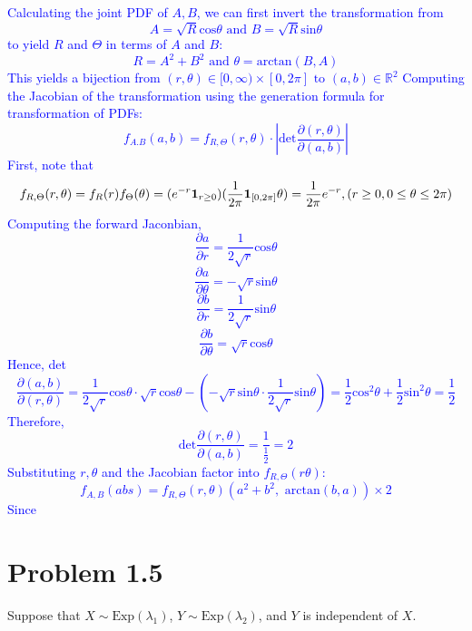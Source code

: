 \documentclass{article}
\begin{document}
\begin{enumerate}[label=(\alph*)]
        \textcolor{blue}{Calculating the joint PDF of $A,B$, we can first invert the transformation from $$A=\sqrt{R}\text{cos}\theta \text{ and } B= \sqrt{R}\text{sin}\theta$$
        to yield $R$ and $\Theta$ in terms of $A$ and $B$:
    $$R=A^2+B^2 \text{ and } \theta=\text{arctan}(B,A)$$
    This yields a bijection from $(r,\theta)\in [0,\infty) \times [0,2\pi] \text{ to } (a,b)\in \mathbb{R}^2$
Computing the Jacobian of the transformation using the generation formula for transformation of PDFs:
$$f_{A.B}(a,b)=f_{R,\Theta}(r,\theta)\cdot \left| \text{det}\frac{\partial(r,\theta)}{\partial(a,b)}\right|$$
First, note that $$f_{R,\Theta}(r,\theta)=f_R(r)f_{\Theta}(\theta)=(e^{-r}\mathbf{1}_{r\geq 0})(\frac{1}{2\pi}\mathbf{1}_{[0,2\pi]}\theta)=\frac{1}{2\pi}e^{-r}, \\ (r\geq 0, 0 \leq \theta \leq 2\pi)$$
Computing the forward Jaconbian, $$\frac{\partial a}{\partial r}=\frac{1}{2\sqrt{r}}\text{cos}\theta$$
$$\frac{\partial a}{\partial \theta}=-\sqrt{r}\text{sin}\theta$$
$$\frac{\partial b}{\partial r}=\frac{1}{2\sqrt{r}}\text{sin}\theta$$
$$\frac{\partial b}{\partial \theta}=\sqrt{r}\text{cos}\theta$$
Hence, det$$\frac{\partial (a,b)}{\partial (r,\theta)}=\frac{1}{2\sqrt{r}}\text{cos}\theta \cdot \sqrt{r}\text{cos}\theta - (-\sqrt{r}\text{sin}\theta \cdot \frac{1}{2\sqrt{r}}\text{sin}\theta)=\frac{1}{2}\text{cos}^2\theta + \frac{1}{2}\text{sin}^2\theta=\frac{1}{2}$$
Therefore, $$\text{det}\frac{\partial (r, \theta)}{\partial (a, b)}=\frac{1}{\frac{1}{2}}=2$$
Substituting $r, \theta$ and the Jacobian factor into $f_{R,\Theta}(r\theta)$:
$$f_{A,B}(abs)=f_{R,\Theta}(r,\theta)(a^2+b^2, \text{ arctan}(b,a)) \times 2$$
Since }

\end{enumerate}

\section*{Problem 1.5}
Suppose that $X \sim \text{Exp}(\lambda_1)$, $Y \sim \text{Exp}(\lambda_2)$, and $Y$ is independent of $X$.
\end{document}
